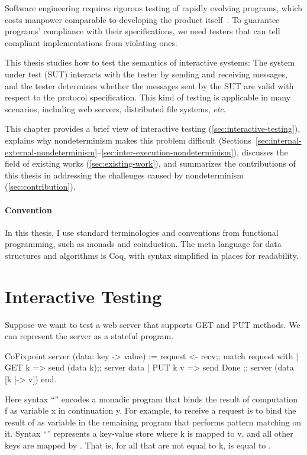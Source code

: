 Software engineering requires rigorous testing of rapidly evolving programs,
which costs manpower comparable to developing the product itself~\cite{vailshery}.  To guarantee
programs' compliance with their specifications, we need testers that can tell
compliant implementations from violating ones.

This thesis studies how to test the semantics of interactive systems: The system
under test (SUT) interacts with the tester by sending and receiving messages,
and the tester determines whether the messages sent by the SUT are valid with
respect to the protocol specification.  This kind of testing is applicable in
many scenarios, including web servers, distributed file systems, {\it etc}.

This chapter provides a brief view of interactive testing
(\autoref{sec:interactive-testing}), explains why nondeterminism makes this
problem difficult
(Sections~\ref{sec:internal-external-nondeterminism}--\ref{sec:inter-execution-nondeterminism}),
discusses the field of existing works (\autoref{sec:existing-work}), and
summarizes the contributions of this thesis in addressing the challenges caused
by nondeterminism (\autoref{sec:contribution}).

\paragraph{Convention}
In this thesis, I use standard terminologies and conventions from functional
programming, such as monads and coinduction.  The meta language for data
structures and algorithms is Coq, with syntax simplified in places for
readability.

\section{Interactive Testing}
\label{sec:interactive-testing}
Suppose we want to test a web server that supports GET and PUT methods.  We can
represent the server as a stateful program.
\begin{coq}
  CoFixpoint server (data: key -> value) :=
    request <- recv;;
    match request with
    | GET k   => send (data k);; server  data
    | PUT k v => send  Done   ;; server (data [k |-> v])
    end.
\end{coq}
Here syntax ``'' encodes a monadic program that binds the result
of computation \ilc f as variable \ilc x in continuation \ilc y.  For example,
to receive a request is to bind the result of  as variable
 in the remaining program that performs pattern matching on it.
Syntax ``'' represents a key-value store where \ilc k is
mapped to \ilc v, and all other keys are mapped by .  That is, for
all  that are not equal to \ilc k,  is equal
to .

